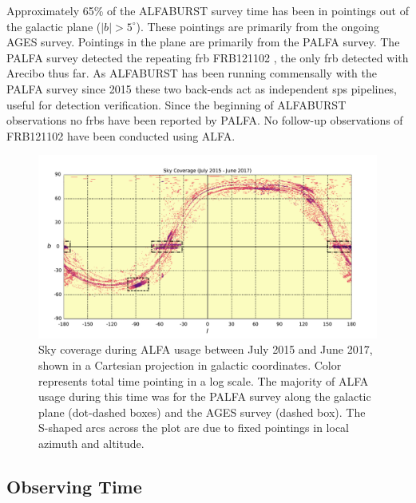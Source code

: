 \documentclass[a4paper,fleqn,usenatbib]{mnras}
\begin{document}
Approximately 65\% of the ALFABURST survey time has been in pointings
out of the galactic plane ($|b| > 5^{\circ}$).  These pointings are
primarily from the ongoing AGES survey.  Pointings in the plane are
primarily from the PALFA survey.  The PALFA survey detected the
repeating \gls{frb} FRB121102 \citep{2014ApJ...790..101S}, the only
\gls{frb} detected with Arecibo thus far.  As ALFABURST has been
running commensally with the PALFA survey since 2015 these two
back-ends act as independent \gls{sps} pipelines, useful for detection
verification.  Since the beginning of ALFABURST observations no
\glspl{frb} have been reported by PALFA. No follow-up observations of
FRB121102 have been conducted using ALFA.

\begin{figure}
    \includegraphics[width=1.0\linewidth]{figures/cartview_sky_coverage.pdf}
    \caption{Sky coverage during ALFA usage between July 2015 and June 2017,
    shown in a Cartesian projection in galactic coordinates. Color represents
    total time pointing in a log scale. The majority of ALFA usage during this
    time was for the PALFA survey along the galactic plane (dot-dashed boxes)
    and the AGES survey (dashed box).  The S-shaped arcs across the plot are due
    to fixed pointings in local azimuth and altitude.
    }
    \label{fig:sky_coverage}
\end{figure}



\subsection{Observing Time}
\label{sec:obs_time}
\end{document}

